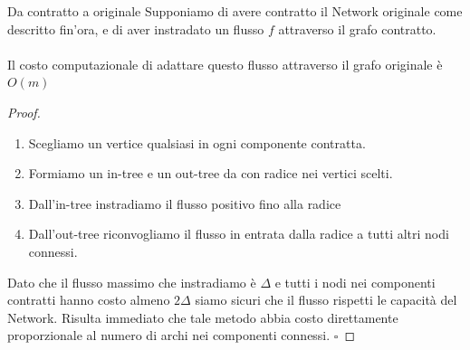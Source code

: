 \documentclass[a4paper, 11pt]{report}
\newcommand*{\QED}{\null\nobreak\hfill\ensuremath{\square}}%
\begin{document}
    \begin{lemma}{Da contratto a originale}{}
        Supponiamo di avere contratto il Network originale come descritto fin'ora, e di aver instradato un flusso $f$ attraverso il grafo contratto.
        \paragraph*{}
        Il costo computazionale di adattare questo flusso attraverso il grafo originale è $O(m)$
    \end{lemma}
    \begin{proof}\begin{enumerate}[nolistsep]
        \item Scegliamo un vertice qualsiasi in ogni componente contratta.
        \item Formiamo un in-tree e un out-tree da con radice nei vertici scelti. 
        \item Dall'in-tree instradiamo il flusso positivo fino alla radice 
        \item Dall'out-tree riconvogliamo il flusso in entrata dalla radice a tutti altri nodi connessi.
    \end{enumerate}
    Dato che il flusso massimo che instradiamo è $\Delta$ e tutti i nodi nei componenti contratti hanno costo almeno $2\Delta$ siamo sicuri che il flusso rispetti le capacità del Network.
    Risulta immediato che tale metodo abbia costo direttamente proporzionale al numero di archi nei componenti connessi.
    \QED
    \end{proof}
\end{document}
